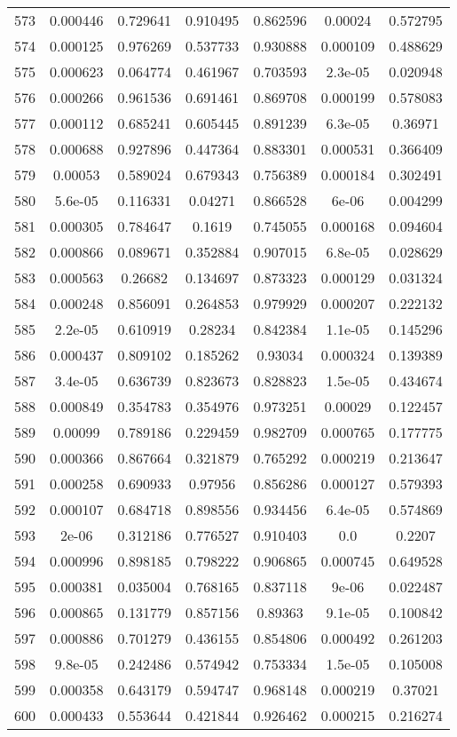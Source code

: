 \begin{table}
\begin{tabular}{c|c|c|c|c|c|c}
573 & 0.000446 & 0.729641 & 0.910495 & 0.862596 & 0.00024 & 0.572795\\
574 & 0.000125 & 0.976269 & 0.537733 & 0.930888 & 0.000109 & 0.488629\\
575 & 0.000623 & 0.064774 & 0.461967 & 0.703593 & 2.3e-05 & 0.020948\\
576 & 0.000266 & 0.961536 & 0.691461 & 0.869708 & 0.000199 & 0.578083\\
577 & 0.000112 & 0.685241 & 0.605445 & 0.891239 & 6.3e-05 & 0.36971\\
578 & 0.000688 & 0.927896 & 0.447364 & 0.883301 & 0.000531 & 0.366409\\
579 & 0.00053 & 0.589024 & 0.679343 & 0.756389 & 0.000184 & 0.302491\\
580 & 5.6e-05 & 0.116331 & 0.04271 & 0.866528 & 6e-06 & 0.004299\\
581 & 0.000305 & 0.784647 & 0.1619 & 0.745055 & 0.000168 & 0.094604\\
582 & 0.000866 & 0.089671 & 0.352884 & 0.907015 & 6.8e-05 & 0.028629\\
583 & 0.000563 & 0.26682 & 0.134697 & 0.873323 & 0.000129 & 0.031324\\
584 & 0.000248 & 0.856091 & 0.264853 & 0.979929 & 0.000207 & 0.222132\\
585 & 2.2e-05 & 0.610919 & 0.28234 & 0.842384 & 1.1e-05 & 0.145296\\
586 & 0.000437 & 0.809102 & 0.185262 & 0.93034 & 0.000324 & 0.139389\\
587 & 3.4e-05 & 0.636739 & 0.823673 & 0.828823 & 1.5e-05 & 0.434674\\
588 & 0.000849 & 0.354783 & 0.354976 & 0.973251 & 0.00029 & 0.122457\\
589 & 0.00099 & 0.789186 & 0.229459 & 0.982709 & 0.000765 & 0.177775\\
590 & 0.000366 & 0.867664 & 0.321879 & 0.765292 & 0.000219 & 0.213647\\
591 & 0.000258 & 0.690933 & 0.97956 & 0.856286 & 0.000127 & 0.579393\\
592 & 0.000107 & 0.684718 & 0.898556 & 0.934456 & 6.4e-05 & 0.574869\\
593 & 2e-06 & 0.312186 & 0.776527 & 0.910403 & 0.0 & 0.2207\\
594 & 0.000996 & 0.898185 & 0.798222 & 0.906865 & 0.000745 & 0.649528\\
595 & 0.000381 & 0.035004 & 0.768165 & 0.837118 & 9e-06 & 0.022487\\
596 & 0.000865 & 0.131779 & 0.857156 & 0.89363 & 9.1e-05 & 0.100842\\
597 & 0.000886 & 0.701279 & 0.436155 & 0.854806 & 0.000492 & 0.261203\\
598 & 9.8e-05 & 0.242486 & 0.574942 & 0.753334 & 1.5e-05 & 0.105008\\
599 & 0.000358 & 0.643179 & 0.594747 & 0.968148 & 0.000219 & 0.37021\\
600 & 0.000433 & 0.553644 & 0.421844 & 0.926462 & 0.000215 & 0.216274\\
\end{tabular}
\end{table}
